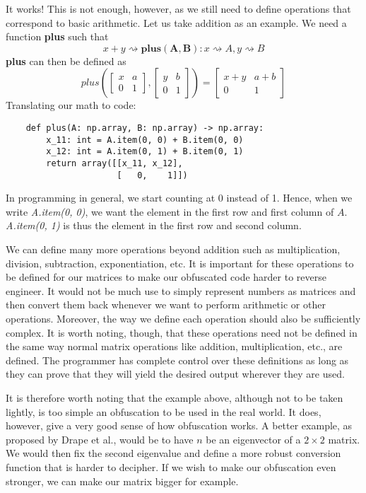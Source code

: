 It works! This is not enough, however, as we still need to define operations
that correspond to basic arithmetic. Let us take addition as an
example. We need a function \textbf{plus} such that
\begin{equation*}
    x + y \rightsquigarrow \mathbf{plus(A, B)} : x \rightsquigarrow A, y
    \rightsquigarrow B
\end{equation*}
\textbf{plus} can then be defined as
\begin{equation*}
    plus\left(
    \begin{bmatrix}
        x & a \\
        0 & 1
    \end{bmatrix},
    \begin{bmatrix}
        y & b \\
        0 & 1
    \end{bmatrix}
    \right)
    =
    \begin{bmatrix}
        x + y & a + b \\
        0     & 1
    \end{bmatrix}
\end{equation*}
Translating our math to code:
\begin{verbatim}
    def plus(A: np.array, B: np.array) -> np.array:
        x_11: int = A.item(0, 0) + B.item(0, 0)
        x_12: int = A.item(0, 1) + B.item(0, 1)
        return array([[x_11, x_12],
                      [   0,    1]])
\end{verbatim}
In programming in general, we start counting at 0 instead of 1. Hence, when we
write \textit{A.item(0, 0)}, we want the element in the first row and first
column
of
$ A $. \textit{A.item(0, 1)} is thus the element in the first row and second
column.

We can define many more operations beyond addition such as
multiplication, division, subtraction, exponentiation, etc. It is important for
these operations to be defined for our matrices to make our obfuscated code
harder to reverse engineer. It would not be much use to simply represent
numbers as
matrices and then convert them back whenever we want to perform arithmetic or
other operations. Moreover, the way we define each operation should also be
sufficiently complex. It is worth noting, though, that these operations need
not be defined in the same way normal matrix operations like addition,
multiplication, etc., are defined. The programmer has complete control over
these definitions as long as they can prove that they will yield the desired
output wherever they are used.

It is therefore worth noting that the example above, although not to be taken
lightly, is too simple an
obfuscation to be used in the real world. It does, however, give a very good
sense of how
obfuscation works. A better example, as proposed by Drape et al., would be to
have $ n $ be an eigenvector of a $ 2 \times 2 $ matrix. We would then fix the
second eigenvalue and define a more robust conversion function that is harder
to decipher. If we wish to make our obfuscation even stronger, we can make our
matrix bigger for example.



